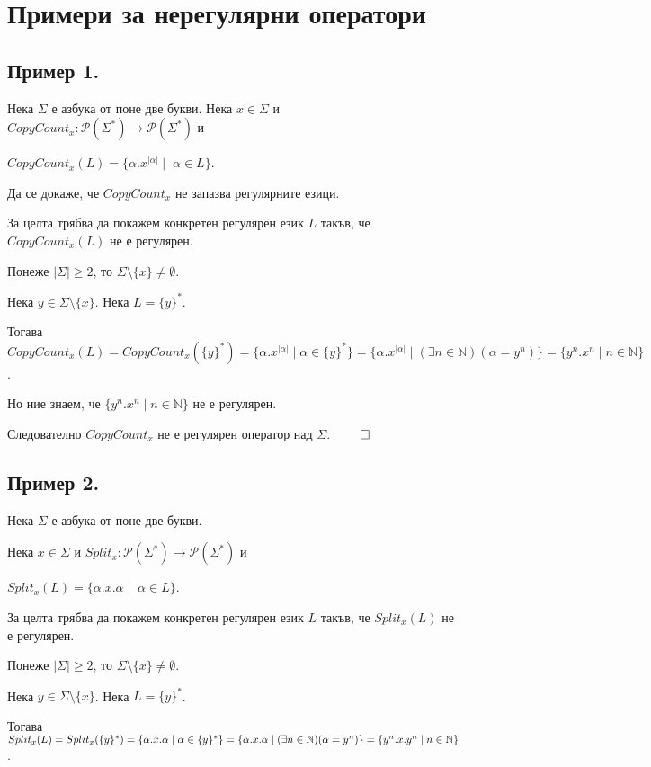 \documentclass[12pt]{article}
\begin{document}
\section*{Примери за нерегулярни оператори}

\subsection*{Пример 1.}
Нека \(\Sigma\) е азбука от поне две букви.
Нека \(x \in \Sigma\) и \(CopyCount_x : \mathcal{P}(\Sigma^*) \to \mathcal{P}(\Sigma^*)\) и

\(CopyCount_x(L) = \{\alpha.x^{|\alpha|} \mid\; \alpha \in L\}\).

Да се докаже, че \(CopyCount_x\) не запазва регулярните езици.

За целта трябва да покажем конкретен регулярен език \(L\) такъв, че \(CopyCount_x(L)\) не е регулярен.

Понеже \(|\Sigma| \geq 2\), то \(\Sigma \setminus \{x\} \neq \emptyset\).

Нека \(y \in \Sigma \setminus \{x\}\). Нека \(L = \{y\}^*\).

Тогава \(CopyCount_x(L) = CopyCount_x(\{y\}^*) = \{\alpha.x^{|\alpha|} \mid \alpha \in \{y\}^*\} = \{\alpha.x^{|\alpha|} \mid (\exists n \in \mathbb N) (\alpha = y^n)\} = \{y^n.x^n \mid n \in \mathbb{N}\}\).

Но ние знаем, че \(\{y^n.x^n \mid n \in \mathbb{N}\}\) не е регулярен.

Следователно \(CopyCount_x\) не е регулярен оператор над \(\Sigma\). \(\qed\)

\subsection*{Пример 2.}
Нека \(\Sigma\) е азбука от поне две букви.

Нека \(x \in \Sigma\) и \(Split_x : \mathcal{P}(\Sigma^*) \to \mathcal{P}(\Sigma^*)\) и

\(Split_x(L) = \{\alpha.x.\alpha \mid\; \alpha \in L\}\).

За целта трябва да покажем конкретен регулярен език \(L\) такъв, че \(Split_x(L)\) не е регулярен.

Понеже \(|\Sigma| \geq 2\), то \(\Sigma \setminus \{x\} \neq \emptyset\).

Нека \(y \in \Sigma \setminus \{x\}\). Нека \(L = \{y\}^*\).

Тогава \(Split_x(L) = Split_x(\{y\}^*) = \{\alpha.x.\alpha \mid \alpha \in \{y\}^*\} = \\
\{\alpha.x.\alpha \mid (\exists n \in \mathbb N) (\alpha = y^n)\} = \{y^n.x.y^n \mid n \in \mathbb{N}\}\).
\end{document}
